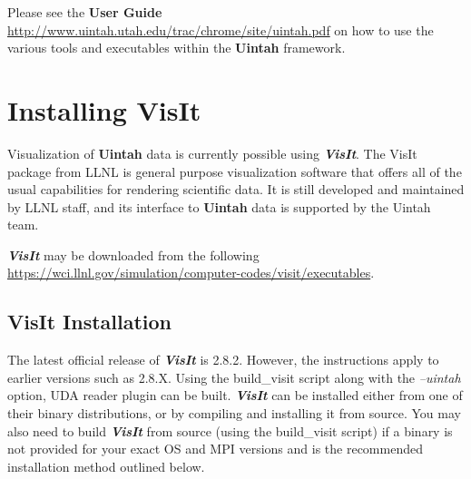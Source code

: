 \documentclass[12pt]{article}
\begin{document}
Please see the \textbf{User Guide}
\url{http://www.uintah.utah.edu/trac/chrome/site/uintah.pdf} on how to use
the various tools and executables within the \textbf{Uintah}
framework.


\section{Installing VisIt}

Visualization of \textbf{Uintah} data is currently possible using
\textbf{\emph{VisIt}}. The VisIt package from LLNL is general purpose
visualization software that offers all of the usual capabilities for
rendering scientific data.  It is still developed and maintained by
LLNL staff, and its interface to \textbf{Uintah} data is supported by
the Uintah team.

\textbf{\emph{VisIt}} may be downloaded from the following \url{https://wci.llnl.gov/simulation/computer-codes/visit/executables}.

\subsection{VisIt Installation}

The latest official release of \textbf{\emph{VisIt}} is 2.8.2.
However, the instructions apply to earlier versions such as 2.8.X.
Using the build\_visit script along with the \emph{--uintah} option,
UDA reader plugin can be built.  \textbf{\emph{VisIt}} can be
installed either from one of their binary distributions, or by
compiling and installing it from source.  You may also need to build
\textbf{\emph{VisIt}} from source (using the build\_visit script) if a
binary is not provided for your exact OS and MPI versions and is the
recommended installation method outlined below.
\end{document}
